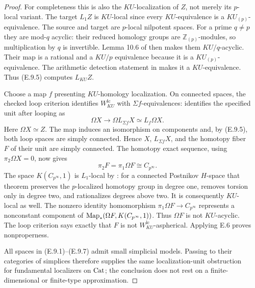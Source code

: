 \begin{proof}
For completeness this is also the $KU$-localization of $Z$,
not merely its $p$-local variant. The target $L_1Z$ is
$KU$-local since every $KU$-equivalence is a
$KU_{(p)}$-equivalence. The source and target are $p$-local
nilpotent spaces. For a prime $q\ne p$ they are mod-$q$
acyclic: their reduced homology groups are $\mathbb Z_{(p)}$-modules,
so multiplication by $q$ is invertible. Lemma 10.6 of
\citet{EH5Bousfield1997} then makes them $KU/q$-acyclic.
Their map is a rational and a $KU/p$ equivalence because it is a
$KU_{(p)}$-equivalence. The arithmetic detection statement in
\citet[Theorem 10.1]{EH5Bousfield1997} makes it a $KU$-equivalence.
Thus (E.9.5) computes $L_{KU}Z$.

Choose a map $f$ presenting $KU$-homology localization.
On connected spaces, the checked loop criterion identifies
$W^{\mathrm{lc}}_{KU}$ with $\Sigma f$-equivalences:
\citet[Theorem 5.2]{EH5Bousfield1997} identifies the specified
unit after looping as
\[
 \Omega X\longrightarrow\Omega L_{\Sigma f}X
            \simeq L_f\Omega X.
                                                               \tag{E.9.6}
\]
Here $\Omega X\simeq Z$. The map induces an isomorphism on
components and, by (E.9.5), both loop spaces are simply connected.
Hence $X$, $L_{\Sigma f}X$, and the homotopy fiber $F$ of their
unit are simply connected. The homotopy exact sequence, using
$\pi_2\Omega X=0$, now gives
\[
             \pi_2F=\pi_1\Omega F
                      \cong C_{p^\infty}.              \tag{E.9.7}
\]
The space $K(C_{p^\infty},1)$ is $L_1$-local by
\citet[Theorem 7.4]{EH5Bousfield2001}: for a connected
Postnikov $H$-space that theorem preserves the $p$-localized
homotopy group in degree one, removes torsion only in degree two,
and rationalizes degrees above two. It is consequently $KU$-local
as well. The nonzero identity homomorphism
$\pi_1\Omega F\to C_{p^\infty}$ represents a nonconstant component
of $\operatorname{Map}_*(\Omega F,K(C_{p^\infty},1))$.
Thus $\Omega F$ is not $KU$-acyclic. The loop criterion says
exactly that $F$ is not $W^{\mathrm{lc}}_{KU}$-aspherical.
Applying E.6 proves nonproperness.

All spaces in (E.9.1)--(E.9.7) admit small simplicial models.
Passing to their categories of simplices therefore supplies the
same localization-unit obstruction for fundamental localizers on
$\mathrm{Cat}$; the conclusion does not rest on a finite-dimensional or
finite-type approximation.
\end{proof}
